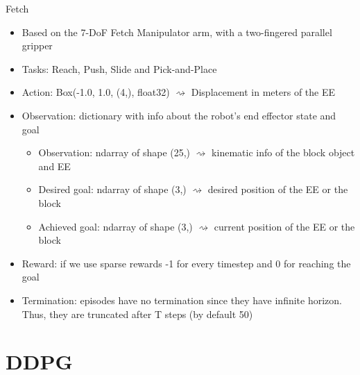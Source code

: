 \documentclass{beamer}
\begin{document}
      \begin{frame}{Fetch}
            \begin{itemize}
                  \item Based on the 7-DoF Fetch Manipulator arm, with a two-fingered parallel gripper
                  \item Tasks: Reach, Push, Slide and Pick-and-Place
                  \item Action: Box(-1.0, 1.0, (4,), float32) $\rightsquigarrow$ Displacement in meters of the EE 
                  \item Observation: dictionary with info about the robot’s end effector state and goal
                        \begin{itemize}
                              \item Observation: ndarray of shape (25,) $\rightsquigarrow$ kinematic info of the block object and EE
                              \item Desired goal: ndarray of shape (3,) $\rightsquigarrow$ desired position of the EE or the block
                              \item Achieved goal: ndarray of shape (3,) $\rightsquigarrow$ current position of the EE or the block
                        \end{itemize}
                  \item Reward: if we use sparse rewards -1 for every timestep and 0 for reaching the goal
                  \item Termination: episodes have no termination since they have infinite horizon. Thus, they are truncated after T steps (by default 50)
            \end{itemize}
      \end{frame}

\section{DDPG}
\end{document}
